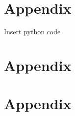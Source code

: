 \appendix
\chapter{Appendix} %

Insert python code

\chapter{Appendix} %

\chapter{Appendix} %

\newpage
